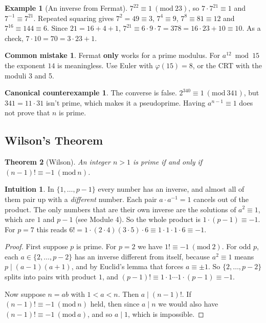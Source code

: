\documentclass[11pt,a4paper]{article}
\newtheorem{theorem}{Theorem}[section]
\theoremstyle{definition}
\newtheorem{example}[theorem]{Example}
\newcommand{\md}[1]{\ (\mathrm{mod}\ #1)}
\theoremstyle{noteit}
\theoremstyle{note}
\newtheorem*{intuition}{Intuition}
\newtheorem*{counter}{Canonical counterexample}
\newtheorem*{mistakeX}{Common mistake}
\newenvironment{mistake}{\begin{mistakeX}\leavevmode\marginpar{\raggedleft\vspace*{-0.9\baselineskip}\dbend}\ignorespaces}{\end{mistakeX}}
\begin{document}
\begin{example}[An inverse from Fermat]
$7^{22}\equiv1\md{23}$, so $7\cdot7^{21}\equiv1$ and $7^{-1}\equiv7^{21}$. Repeated squaring gives $7^2=49\equiv3$, $7^4\equiv9$, $7^8\equiv81\equiv12$ and $7^{16}\equiv144\equiv6$. Since $21=16+4+1$, $7^{21}\equiv6\cdot9\cdot7=378=16\cdot23+10\equiv10$. As a check, $7\cdot10=70=3\cdot23+1$.
\end{example}

\begin{mistake}
Fermat \textbf{only} works for a prime modulus. For $a^{12}\bmod15$ the exponent $14$ is meaningless. Use Euler with $\varphi(15)=8$, or the CRT with the moduli 3 and 5.
\end{mistake}

\begin{counter}
The converse is false. $2^{340}\equiv1\md{341}$, but $341=11\cdot31$ isn't prime, which makes it a pseudoprime. Having $a^{n-1}\equiv1$ does not prove that $n$ is prime.
\end{counter}

\subsection{Wilson's Theorem}

\begin{theorem}[Wilson]
An integer $n>1$ is prime if and only if $(n-1)!\equiv-1\md n$.
\end{theorem}

\begin{intuition}
In $\{1,\dots,p-1\}$ every number has an inverse, and almost all of them pair up with a \emph{different} number. Each pair $a\cdot a^{-1}=1$ cancels out of the product. The only numbers that are their own inverse are the solutions of $a^2\equiv1$, which are $1$ and $p-1$ (see Module 4). So the whole product is $1\cdot(p-1)\equiv-1$. For $p=7$ this reads $6!=1\cdot(2\cdot4)(3\cdot5)\cdot6\equiv1\cdot1\cdot1\cdot6\equiv-1$.
\end{intuition}

\begin{proof}
First suppose $p$ is prime. For $p=2$ we have $1!\equiv-1\md2$. For odd $p$, each $a\in\{2,\dots,p-2\}$ has an inverse different from itself, because $a^2\equiv1$ means $p\mid(a-1)(a+1)$, and by Euclid's lemma that forces $a\equiv\pm1$. So $\{2,\dots,p-2\}$ splits into pairs with product $1$, and $(p-1)!\equiv1\cdot1\cdots1\cdot(p-1)\equiv-1$.

Now suppose $n=ab$ with $1<a<n$. Then $a\mid(n-1)!$. If $(n-1)!\equiv-1\md n$ held, then since $a\mid n$ we would also have $(n-1)!\equiv-1\md a$, and so $a\mid 1$, which is impossible.
\end{proof}
\end{document}
